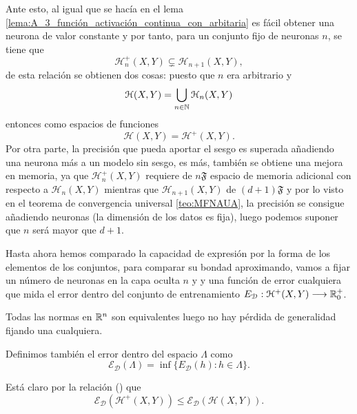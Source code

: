 \begin{aportacionOriginal}
Ante esto, al igual que se hacía en el lema \ref{lema:A_3_función_activación_continua_con_arbitaria}
es fácil obtener una neurona de valor constante y por tanto, para un conjunto fijo de neuronas $n$, se tiene que 
\begin{equation}
    \mathcal{H}^+_n(X,Y) \subsetneq  \mathcal{H}_{n+1}(X,Y),
\end{equation}
de esta relación se obtienen dos cosas: 
puesto que $n$ era arbitrario y 
\begin{equation}
    \mathcal{H}(X,Y) = \bigcup_{n \in \mathbb{N}} \mathcal{H}_n (X,Y)
\end{equation}
entonces como espacios de funciones 
\begin{equation}
    \mathcal{H}(X,Y) = \mathcal{H}^+ (X,Y).
\end{equation}
Por otra parte, la precisión que pueda aportar el sesgo es
superada añadiendo una neurona más a un modelo sin sesgo, es más, también se obtiene una mejora en memoria, ya que 
$\mathcal{H}^+_n(X,Y)$ requiere de $n \mathfrak{F}$ espacio de memoria adicional con respecto a $\mathcal{H}_n(X,Y)$
mientras que $\mathcal{H}_{n+1}(X,Y)$ de $(d +1) \mathfrak{F}$
y por lo visto en el teorema de convergencia universal \ref{teo:MFNAUA}, la precisión se consigue añadiendo neuronas (la dimensión de los datos es fija),
luego podemos suponer que $n$ será mayor que $d+1$. 

Hasta ahora hemos comparado la capacidad de expresión 
por la forma de los elementos de los conjuntos, para comparar su bondad aproximando, vamos a fijar  un 
 número de neuronas en la capa oculta $n$ y 
 y una función de error cualquiera que mida el error dentro 
 del conjunto de entrenamiento
 $E_{\mathcal{D}}:\mathcal{H}^+(X,Y) \longrightarrow \mathbb{R}^+_0$.
 
 Todas las normas en $\mathbb{R}^n$ son equivalentes luego no hay pérdida de generalidad fijando una cualquiera.  

 Definimos también el error dentro del espacio $\Lambda$ como 
 \begin{equation}
    \mathcal{E}_{\mathcal{D}} (\Lambda)
    = \inf \{ E_{\mathcal{D}}(h) : h \in \Lambda\}.
 \end{equation}

Está claro por la relación  
 ()
 que 
 \begin{equation}
    \mathcal{E}_{\mathcal{D}}(\mathcal{H}^+(X,Y))
    \leq
    \mathcal{E}_{\mathcal{D}}(\mathcal{H}(X,Y)).
 \end{equation}


\end{aportacionOriginal}
